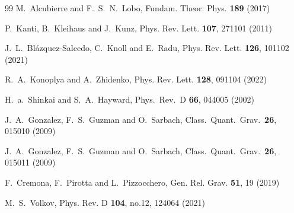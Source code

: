 \documentclass{article}
\begin{document}
\begin{small}
\begin{thebibliography}{99}
M.~Alcubierre and F.~S.~N.~Lobo,
Fundam. Theor. Phys. \textbf{189} (2017) 

P.~Kanti, B.~Kleihaus and J.~Kunz,
Phys. Rev. Lett. \textbf{107}, 271101 (2011)

J.~L.~Bl\'azquez-Salcedo, C.~Knoll and E.~Radu,
Phys. Rev. Lett. \textbf{126}, 101102 (2021)

R.~A.~Konoplya and A.~Zhidenko,
Phys. Rev. Lett. \textbf{128}, 091104 (2022)

  H.~a.~Shinkai and S.~A.~Hayward,
  Phys.\ Rev.\ D {\bf 66}, 044005 (2002)

  J.~A.~Gonzalez, F.~S.~Guzman and O.~Sarbach,
  Class.\ Quant.\ Grav.\  {\bf 26}, 015010 (2009)

  J.~A.~Gonzalez, F.~S.~Guzman and O.~Sarbach,
  Class.\ Quant.\ Grav.\  {\bf 26},  015011 (2009)

F.~Cremona, F.~Pirotta and L.~Pizzocchero,
Gen. Rel. Grav. \textbf{51}, 19 (2019)

M.~S.~Volkov,
Phys. Rev. D \textbf{104}, no.12, 124064 (2021)


\end{thebibliography}
\end{small}
\end{document}
